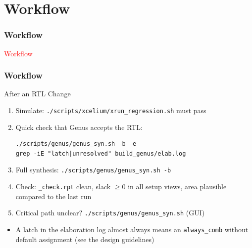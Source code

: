 \documentclass{beamer}
\newcommand{\astitle}{nix}
\newcommand{\assubtitle}{nix}
\newcommand{\cmd}[1]{\texttt{#1}}
\begin{document}
\section{Workflow}
\renewcommand{\astitle}{Workflow}
\begin{frame}
\frametitle{\astitle}
\textcolor{red}{Workflow}
\end{frame}

\renewcommand{\assubtitle}{After an RTL Change}
\begin{frame}[fragile]
\frametitle{\astitle}
\begin{block}{\assubtitle}
  \footnotesize
  \begin{enumerate}
    \item Simulate: \cmd{./scripts/xcelium/xrun\_regression.sh} must pass
    \item Quick check that Genus accepts the RTL:
\begin{lstlisting}[style=sh]
./scripts/genus/genus_syn.sh -b -e
grep -iE "latch|unresolved" build_genus/elab.log
\end{lstlisting}
    \item Full synthesis: \cmd{./scripts/genus/genus\_syn.sh -b}
    \item Check: \cmd{\_check.rpt} clean, slack $\ge 0$ in all setup views,
      area plausible compared to the last run
    \item Critical path unclear? \cmd{./scripts/genus/genus\_syn.sh} (GUI)
  \end{enumerate}
  \vspace{4pt}
  \begin{itemize}
    \item A latch in the elaboration log almost always means an \cmd{always\_comb}
      without default assignment (see the design guidelines)
  \end{itemize}
\end{block}
\end{frame}
\end{document}
